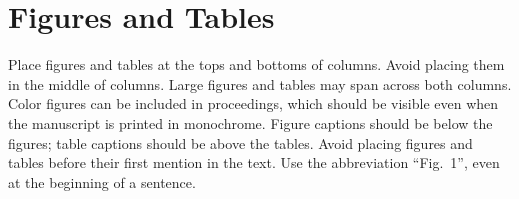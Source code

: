 \documentclass[twocolumn,a4paper]{article}
\begin{document}

\section{Figures and Tables}

Place figures and tables at the tops and bottoms of columns.
Avoid placing them in the middle of columns.
Large figures and tables may span across both columns.
Color figures can be included in proceedings,
which should be visible even when the manuscript is printed in monochrome.
Figure captions should be below the figures; table captions should be above the tables.
Avoid placing figures and tables before their first mention in the text.
Use the abbreviation ``Fig.~1'', even at the beginning of a sentence.
\end{document}
